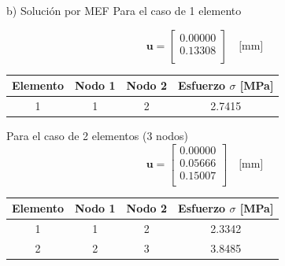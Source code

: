 \begin{desarrollo}{b) Soluci\'on por MEF}
Para el caso de 1 elemento 

\begin{equation}
\mathbf{u} = \begin{bmatrix}
    0.00000 \\
    0.13308 \\
\end{bmatrix} \quad \text{[mm]}
\end{equation}

\begin{center}
    
    \begin{tabular}{cccc}
        \hline
        \textbf{Elemento} & \textbf{Nodo 1} & \textbf{Nodo 2} & \textbf{Esfuerzo $\sigma$ [MPa]} \\
        \hline
        1 & 1 & 2 & 2.7415 \\
        \hline
    \end{tabular}
    \label{tab:esfuerzos 1}
\label{tab:esfuerzos1}
\end{center}
Para el caso de 2 elementos (3 nodos)
\begin{equation}
\mathbf{u} = \begin{bmatrix}
   0.00000 \\
    0.05666 \\
    0.15007 \\
\end{bmatrix} \quad \text{[mm]}
\end{equation}

\begin{center}

     \begin{tabular}{cccc}
        \hline
        \textbf{Elemento} & \textbf{Nodo 1} & \textbf{Nodo 2} & \textbf{Esfuerzo $\sigma$ [MPa]} \\
        \hline
        1 & 1 & 2 & 2.3342 \\
        2 & 2 & 3 & 3.8485 \\
        \hline
    \end{tabular}
    \label{tab:esfuerzos 2}
\label{tab:esfuerzos2}
\end{center}


\end{desarrollo}
